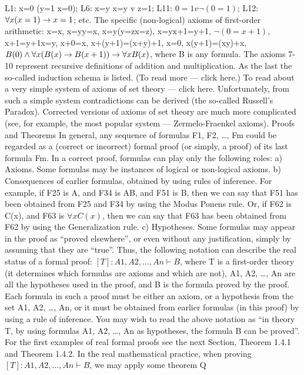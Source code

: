 L1: x=0 \IMPLIES  (y=1 \IMPLIES  x=0);
L6: x=y \IMPLIES  x=y v z=1;
L11: \(0=1 v \neg (0=1)\);
L12: \(\forall x(x=1) \rightarrow  x=1\);
etc.
The specific (non-logical) axioms of first-order arithmetic:
x=x,
x=y\IMPLIES y=x,
x=y\IMPLIES (y=z\IMPLIES x=z),
x=y\IMPLIES x+1=y+1,
\(\neg (0=x+1),\)
x+1=y+1\IMPLIES x=y,
x+0=x,
x+(y+1)=(x+y)+1,
x=0,
x\cdot (y+1)=(x\cdot y)+x,
\(B(0) \wedge  \forall x(B(x)\rightarrow B(x+1))\rightarrow \forall xB(x)\), where B is any formula.
The axioms 7-10 represent recursive definitions of addition and multiplication. As the last the so-called induction schema is
listed. (To read more --- click here.)
To read about a very simple system of axioms of set theory --- click here. Unfortunately, from such a simple system
contradictions can be derived (the so-called Russell's Paradox). Corrected versions of axioms of set theory are much more
complicated (see, for example, the most popular system --- Zermelo-Fraenkel axioms).
Proofs and Theorems
In general, any sequence of formulas F1, F2, \ldots , Fm could be regarded as a (correct or incorrect) formal
proof (or simply, a proof) of its last formula Fm. In a correct proof, formulas can play only the following
roles:
a) Axioms. Some formulas may be instances of logical or non-logical axioms.
b) Consequences of earlier formulas, obtained by using rules of inference. For example, if F25 is A, and
F34 is A\IMPLIES B, and F51 is B, then we can say that F51 has been obtained from F25 and F34 by using the
Modus Ponens rule. Or, if F62 is C(x), and F63 is \(\forall xC(x)\), then we can say that F63 has been obtained
from F62 by using the Generalization rule.
c) Hypotheses. Some formulas may appear in the proof as ``proved elsewhere'', or even without any
justification, simply by assuming that they are ``true''.
Thus, the following notation can describe the real status of a formal proof:
\([T]: A1, A2, \ldots , An \vdash B\),
where T is a first-order theory (it determines which formulas are axioms and which are not), A1, A2, \ldots , An
are all the hypotheses used in the proof, and B is the formula proved by the proof. Each formula in such a
proof must be either an axiom, or a hypothesis from the set A1, A2, \ldots , An, or it must be obtained from
earlier formulas (in this proof) by using a rule of inference. You may wish to read the above notation as
``in theory T, by using formulas A1, A2, \ldots , An as hypotheses, the formula B can be proved''.
For the first examples of real formal proofs see the next Section, Theorem 1.4.1 and Theorem 1.4.2.
In the real mathematical practice, when proving \([T]: A1, A2, \ldots , An \vdash B\), we may apply some theorem Q
